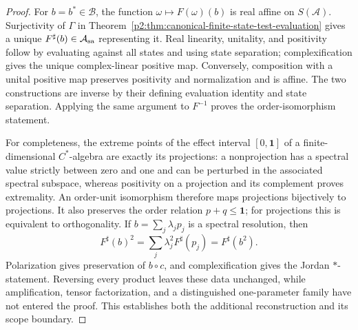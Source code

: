 \documentclass[12pt,a4paper]{article}
\begin{document}
\begin{proof}
For \(b=b^*\in\mathcal B\), the function
\(\omega\mapsto F(\omega)(b)\) is real affine on \(S(\mathcal A)\).
Surjectivity of \(\Gamma\) in
Theorem~\ref{p2:thm:canonical-finite-state-test-evaluation} gives a unique
\(F^\sharp(b)\in\mathcal A_{\rm sa}\) representing it.  Real linearity,
unitality, and positivity follow by evaluating against all states and using
state separation; complexification gives the unique complex-linear positive
map.  Conversely, composition with a unital positive map preserves positivity
and normalization and is affine.  The two constructions are inverse by their
defining evaluation identity and state separation.  Applying the same
argument to \(F^{-1}\) proves the order-isomorphism statement.

For completeness, the extreme points of the effect interval
\([0,\mathbf1]\) of a finite-dimensional \(C^*\)-algebra are exactly its
projections: a nonprojection has a spectral value strictly between zero and
one and can be perturbed in the associated spectral subspace, whereas
positivity on a projection and its complement proves extremality.  An
order-unit isomorphism therefore maps projections bijectively to projections.
It also preserves the order relation \(p+q\le\mathbf1\); for projections this
is equivalent to orthogonality.  If
\(b=\sum_j\lambda_jp_j\) is a spectral resolution, then
\[
 F^\sharp(b)^2
 =\sum_j\lambda_j^2F^\sharp(p_j)
 =F^\sharp(b^2).
\]
Polarization gives preservation of \(b\circ c\), and complexification gives
the Jordan \(*\)-statement.  Reversing every product leaves these data
unchanged, while amplification, tensor factorization, and a distinguished
one-parameter family have not entered the proof.  This establishes both the
additional reconstruction and its scope boundary.
\end{proof}
\end{document}
